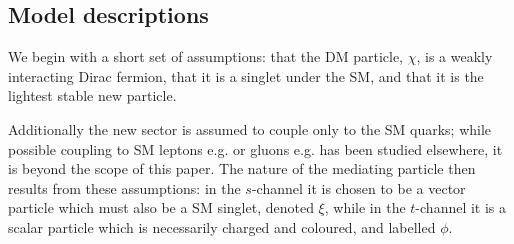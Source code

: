 \subsection{Model descriptions}
We begin with a short set of assumptions: that the DM particle, $\chi$, is a weakly interacting Dirac fermion, that it is a singlet under the SM, and that it is the lightest stable new particle.

Additionally the new sector is assumed to couple only to the SM quarks; while possible coupling to SM leptons e.g. \cite{Fox:2011fx} or gluons e.g. \cite{SiM_gluons} has been studied elsewhere, it is beyond the scope of this paper. The nature of the mediating particle then results from these assumptions: in the $s$-channel it is chosen to be a vector particle which must also be a SM singlet, denoted $\xi$, while in the $t$-channel it is a scalar particle which is necessarily charged and coloured, and labelled $\phi$.

